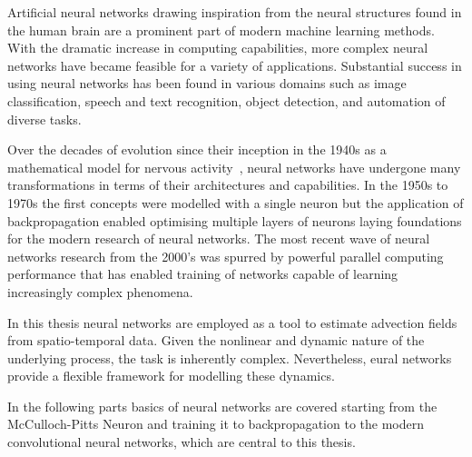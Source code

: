 Artificial neural networks drawing inspiration from the neural structures found in the human brain are a prominent part of modern machine learning methods.
With the dramatic increase in computing capabilities, more complex neural networks have became feasible for a variety of applications.
Substantial success in using neural networks has been found in various domains such as image classification, speech and text recognition, object detection, and automation of diverse tasks.

Over the decades of evolution since their inception in the 1940s as a mathematical model for nervous activity~\cite{mcculloch, hebb}, neural networks have undergone many transformations in terms of their architectures and capabilities.
In the 1950s to 1970s the first concepts were modelled with a single neuron but the application of backpropagation enabled optimising multiple layers of neurons laying foundations for the modern research of neural networks.
The most recent wave of neural networks research from the 2000's was spurred by powerful parallel computing performance that has enabled training of networks capable of learning increasingly complex phenomena.

In this thesis neural networks are employed as a tool to estimate advection fields from spatio-temporal data.
Given the nonlinear and dynamic nature of the underlying process, the task is inherently complex.
Nevertheless, eural networks provide a flexible framework for modelling these dynamics.

In the following parts basics of neural networks are covered starting from the McCulloch-Pitts Neuron and training it to backpropagation to the modern convolutional neural networks, which are central to this thesis.

